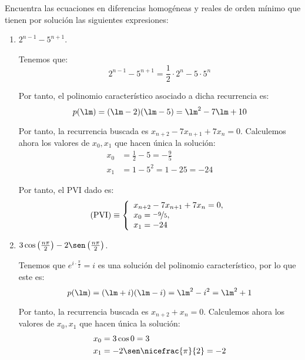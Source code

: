\begin{ejercicio}
    Encuentra las ecuaciones en diferencias homogéneas y reales de orden mínimo que tienen por solución las siguientes
    expresiones:
    \begin{enumerate}
        \item $2^{n-1} - 5^{n+1}$.

        Tenemos que:
        \begin{equation*}
            2^{n-1} - 5^{n+1} = \frac{1}{2}\cdot 2^n -5\cdot 5^n
        \end{equation*}

        Por tanto, el polinomio característico asociado a dicha recurrencia es:
        \begin{equation*}
            p(\lm) = (\lm-2)(\lm-5) = \lm^2-7\lm +10
        \end{equation*}

        Por tanto, la recurrencia buscada es $x_{n+2}-7x_{n+1}+7x_n=0$. Calculemos ahora los valores de $x_0,x_1$ que hacen única la solución:
        \begin{align*}
            x_0 &= \frac{1}{2} -5 = -\frac{9}{5}\\
            x_1 &= 1-5^2 = 1-25=-24
        \end{align*}

        Por tanto, el PVI dado es:
        \begin{equation*}
            \text{(PVI)}\equiv \left\{ \begin{array}{l}
                x_{n+2}-7x_{n+1}+7x_n=0,\\
                x_0=\nicefrac{-9}{5},\\
                x_1=-24
            \end{array}\right.
        \end{equation*}

        
        \item $3\cos\left(\frac{n\pi}{2}\right) - 2\sen\left(\frac{n\pi}{2}\right)$.

        Tenemos que $e^{i\cdot \frac{\pi}{2}}=i$ es una solución del polinomio característico, por lo que este es:
        \begin{equation*}
            p(\lm) = (\lm+i)(\lm-i) = \lm^2-i^2 = \lm^2+1
        \end{equation*}

        Por tanto, la recurrencia buscada es $x_{n+2}+x_n=0$. Calculemos ahora los valores de $x_0,x_1$ que hacen única la solución:
        \begin{align*}
            x_0 &= 3\cos 0 = 3\\
            x_1 &= -2\sen\nicefrac{\pi}{2} = -2
        \end{align*}


\end{enumerate}
\end{ejercicio}
